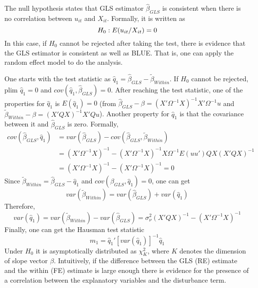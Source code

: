 \documentclass[11pt, a4paper, leqno]{article}
\begin{document}
The null hypothesis states that GLS estimator $\widehat\beta_{GLS}$ is consistent when there is no correlation between $u_{it}$ and $X_{it}$. Formally, it is written as$$\emph{$H_0$}: E(u_{it}/X_{it}) = 0$$In this case, if $H_0$ cannot be rejected after taking the test, there is evidence that the GLS estimator is consistent as well as BLUE. That is, one can apply the random effect model to do the analysis.

One starts with the test statistic as 
$\widehat q_1 = \widehat \beta_{GLS} - \widetilde \beta_{Within}$. If $H_0$ cannot be rejected, plim $\widehat q_1 = 0$ and $cov(\widehat q_1, \widehat\beta_{GLS}) = 0$. After reaching the test statistic, one of the properties for $\widehat q_1$ is $E(\widehat q_1) = 0$ (from $\widehat\beta_{GLS} - \beta = (X'\Omega^{-1}X)^{-1}X'\Omega^{-1}u$ and $\widetilde\beta_{Within} - \beta = (X'QX)^{-1}X'Qu$). Another property for $\widehat q_1$ is that the covariance between it and $\widehat\beta_{GLS}$ is zero. Formally,
    \begin{equation} \begin{split}
    cov(\widehat\beta_{GLS}, \widehat q_1)
    &= var(\widehat\beta_{GLS}) - cov(\widehat\beta_{GLS}, \widetilde\beta_{Within}) \\ &= (X'\Omega^{-1}X)^{-1} - (X'\Omega^{-1}X)^{-1}X\Omega^{-1}E(uu')QX(X'QX)^{-1} \\ &= (X'\Omega^{-1}X)^{-1} - (X'\Omega^{-1}X)^{-1} = 0
    \end{split}\end{equation}
    Since $\widetilde \beta_{Within} = \widehat \beta_{GLS} - \widehat q_1$ and $cov(\widehat \beta_{GLS}, \widehat q_1) = 0$, one can get
    \begin{equation}
    var(\widetilde \beta_{Within}) = var(\widehat \beta_{GLS}) + var(\widehat q_1)
    \end{equation}
    Therefore,
    \begin{equation}
    var(\widehat q_1) = var(\widetilde \beta_{Within}) - var(\widehat \beta_{GLS}) = \sigma_{\nu}^2(X'QX)^{-1} - (X'\Omega^{-1}X)^{-1}
    \end{equation}
    Finally, one can get the Hausman test statistic
    \begin{equation}
    m_1 = \widehat q_1'[var(\widehat q_1)]^{-1}\widehat q_1
    \end{equation}
Under $H_0$ it is asymptotically distributed as $\chi_K^2$, where $K$ denotes the dimension of slope vector $\beta$. Intuitively, if the difference between the GLS (RE) estimate and the within (FE) estimate is large enough there is evidence for the presence of a correlation between the explanatory variables and the disturbance term.
\end{document}
